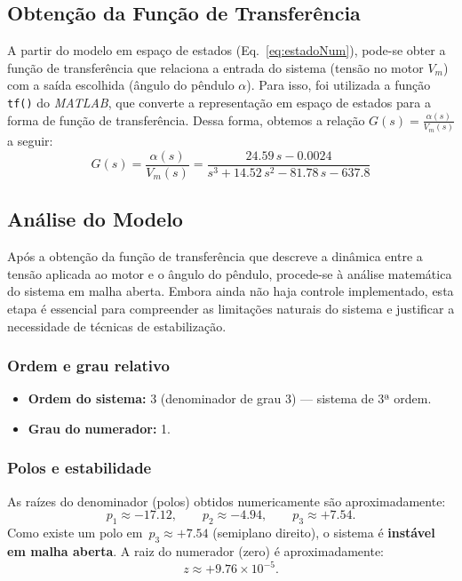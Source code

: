 \documentclass[9pt,a4paper,twocolumn,twoside]{tau-class/tau}
\begin{document}
\subsection{Obtenção da Função de Transferência}
A partir do modelo em espaço de estados (Eq.~\ref{eq:estadoNum}), pode-se obter a 
função de transferência que relaciona a entrada do sistema (tensão no motor $V_m$) 
com a saída escolhida (ângulo do pêndulo $\alpha$). Para isso, foi utilizada a 
função \texttt{tf()} do \textit{MATLAB}, que converte a representação em espaço 
de estados para a forma de função de transferência. Dessa forma, obtemos a relação
\(G(s) = \frac{\alpha(s)}{V_m(s)}\) a seguir: \\

\begin{equation}
    G(s) = \frac{\alpha(s)}{V_m(s)}
         = \frac{24.59\,s - 0.0024}{s^3 + 14.52\,s^2 - 81.78\,s - 637.8}
\end{equation}

\subsection{Análise do Modelo}
Após a obtenção da função de transferência que descreve a dinâmica entre a tensão aplicada ao motor e o ângulo do pêndulo, procede-se
à análise matemática do sistema em malha aberta. Embora ainda não haja controle implementado, esta etapa é essencial para compreender
as limitações naturais do sistema e justificar a necessidade de técnicas de estabilização.

\subsubsection*{Ordem e grau relativo}
\begin{itemize}
    \item \textbf{Ordem do sistema:} 3 (denominador de grau 3) — sistema de 3ª ordem.
    \item \textbf{Grau do numerador:} 1.
\end{itemize}

\subsubsection*{Polos e estabilidade}
As raízes do denominador (polos) obtidos numericamente são aproximadamente:
\[
p_1 \approx -17.12,\qquad p_2 \approx -4.94,\qquad p_3 \approx +7.54.
\]
Como existe um polo em \(\,p_3 \approx +7.54\) (semiplano direito), o sistema é \textbf{instável em malha aberta}. A raiz do numerador
(zero) é aproximadamente:
\[
z \approx +9.76\times 10^{-5}.
\]
\end{document}
